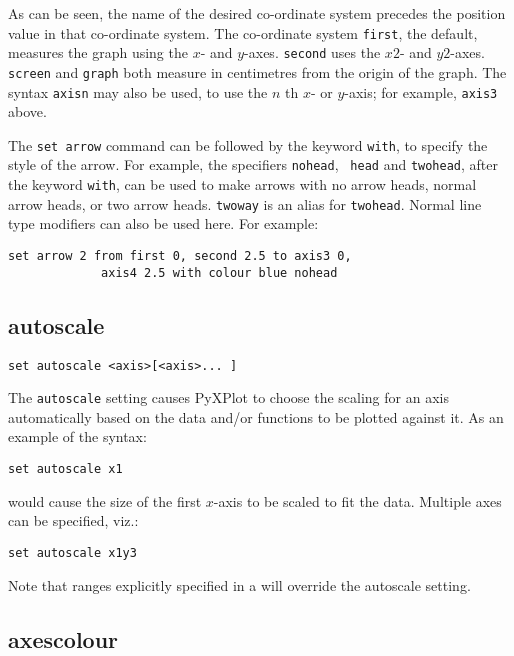 As can be seen, the name of the desired co-ordinate system precedes the position
value in that co-ordinate system. The co-ordinate system {\tt first}, the default,
measures the graph using the $x$- and $y$-axes. {\tt second} uses the $x2$- and
$y2$-axes.  {\tt screen} and {\tt graph} both measure in centimetres from the
origin of the graph.  The syntax {\tt axisn} may also be
used, to use the $n$ th $x$- or $y$-axis; for example, {\tt axis3} above.

The {\tt set arrow} command can be followed by the keyword {\tt with}, to
specify the style of the arrow. For example, the specifiers {\tt nohead}, {\tt
head} and {\tt twohead}, after the keyword {\tt with}, can be used to make
arrows with no arrow heads, normal arrow heads, or two arrow heads. {\tt twoway}
is an alias for {\tt twohead}.  Normal line type modifiers can also be used
here.  For example:

\begin{verbatim}
set arrow 2 from first 0, second 2.5 to axis3 0,
             axis4 2.5 with colour blue nohead
\end{verbatim}


\subsection{autoscale}

\begin{verbatim}
set autoscale <axis>[<axis>... ]
\end{verbatim}

The {\tt autoscale} setting causes PyXPlot to choose the scaling for an axis
automatically based on the data and/or functions to be plotted against it. As
an example of the syntax:

\begin{verbatim}
set autoscale x1
\end{verbatim}

\noindent would cause the size of the first $x$-axis to be scaled to fit the
data.  Multiple axes can be specified, viz.:

\begin{verbatim}
set autoscale x1y3
\end{verbatim}

Note that ranges explicitly specified in a  will override
the autoscale setting.


\subsection{axescolour}

